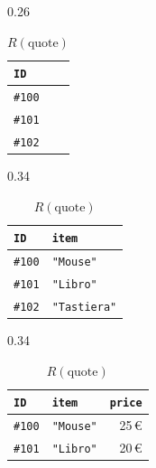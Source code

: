 \begin{table}[htbp]
\centering
\small
\caption{Materializzazione fisica delle relazioni locali nell'adattatore di \textup{\textsc{Buyer}}.}
\label{tab:bspl_physical_example}

\begin{subtable}[t]{0.26\textwidth}
\centering
\caption*{$R(\text{init})$}
\begin{tabular}{l}
\toprule
\textbf{\texttt{ID}} \\
\midrule
\texttt{\#100} \\
\texttt{\#101} \\
\texttt{\#102} \\
\bottomrule
\end{tabular}
\end{subtable}
\hfill
\begin{subtable}[t]{0.34\textwidth}
\centering
\caption*{$R(\text{rfq})$}
\begin{tabular}{ll}
\toprule
\textbf{\texttt{ID}} & \textbf{\texttt{item}} \\
\midrule
\texttt{\#100} & \texttt{"Mouse"} \\
\texttt{\#101} & \texttt{"Libro"} \\
\texttt{\#102} & \texttt{"Tastiera"} \\
\bottomrule
\end{tabular}
\end{subtable}
\hfill
\begin{subtable}[t]{0.34\textwidth}
\centering
\caption*{$R(\text{quote})$}
\begin{tabular}{llr}
\toprule
\textbf{\texttt{ID}} & \textbf{\texttt{item}} & \textbf{\texttt{price}} \\
\midrule
\texttt{\#100} & \texttt{"Mouse"} & 25\,€ \\
\texttt{\#101} & \texttt{"Libro"} & 20\,€ \\
\bottomrule
\end{tabular}
\end{subtable}

\vspace{1.5em} %


\end{table}
